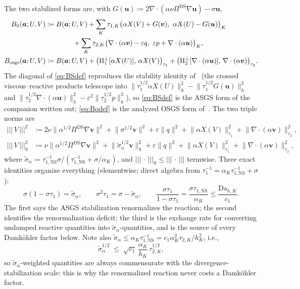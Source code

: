 \documentclass[11pt]{article}
\theoremstyle{remark}
\newcommand{\bu}{\boldsymbol{u}}
\newcommand{\bv}{\boldsymbol{v}}
\newcommand{\ba}{\boldsymbol{a}}
\newcommand{\ViscProj}{\Pi^{\mathrm{DS}}}
\newcommand{\norm}[1]{\lVert #1 \rVert}
\newcommand{\tnorm}[1]{\lvert\!\lvert\!\lvert\, #1 \,\rvert\!\rvert\!\rvert}
\newcommand{\tns}{\tau_{1,\mathrm{NS}}}
\newcommand{\Dah}{\mathrm{Da}_{h,K}}
\newcommand{\Poneo}{\Pi_{1}^{\perp}}
\newcommand{\Ptwoo}{\Pi_{2}^{\perp}}
\newcommand{\st}{\widetilde{\sigma}_\alpha}
\newcommand{\Bs}{B_{\mathrm{S}}}
\newcommand{\Bo}{B_{\mathrm{osgs}}}
\begin{document}
The two stabilized forms are, with $G(\bu) \coloneqq
2\nabla\cdot(\alpha\nu\ViscProj\nabla\bu) - \sigma\bu$,
\begin{align}
  \Bs(\ba; U, V)
  &\coloneqq B(\ba; U, V)
  + \sum_K \tau_{1,K}\bigl( \alpha X(V) + G(\bv),\ \alpha X(U) - G(\bu) \bigr)_K
  \notag\\
  &\qquad\qquad
  + \sum_K \tau_{2,K}\bigl( \nabla\cdot(\alpha\bv) - \varepsilon q,\
  \varepsilon p + \nabla\cdot(\alpha\bu) \bigr)_K,
  \label{eq:BSdef}\\
  \Bo(\ba; U, V)
  &\coloneqq B(\ba; U, V)
  + \bigl( \Poneo[\alpha X(U)],\, \alpha X(V) \bigr)_{\tau_1}
  + \bigl( \Ptwoo[\nabla\cdot(\alpha\bu)],\, \nabla\cdot(\alpha\bv) \bigr)_{\tau_2}.
  \label{eq:Bodef}
\end{align}
The diagonal of \cref{eq:BSdef} reproduces the stability identity
of~\cite{companion} (the crossed viscous--reactive products telescope into
$\norm{\tau_1^{1/2}\alpha X(U)}_h^2 - \norm{\tau_1^{1/2}G(\bu)}_h^2$ and
$\norm{\tau_2^{1/2}\nabla\cdot(\alpha\bu)}_h^2 - \varepsilon^2
\norm{\tau_2^{1/2}p}_h^2$), so \cref{eq:BSdef} is the ASGS form of the companion
written out; \cref{eq:Bodef} is the analyzed OSGS form of~\cite{OSGSnote}. The two
triple norms are
\begin{align}
  \tnorm{V}^2
  &\coloneqq
  2\nu\norm{\alpha^{1/2}\ViscProj\nabla\bv}^2
  + \norm{\sigma^{1/2}\bv}^2
  + \varepsilon\norm{q}^2
  + \norm{\alpha X(V)}_{\tau_1}^2
  + \norm{\nabla\cdot(\alpha\bv)}_{\tau_2}^2,
  \label{eq:StrongNorm}\\
  \tnorm{V}_{\mathrm{S}}^2
  &\coloneqq
  \nu\norm{\alpha^{1/2}\ViscProj\nabla\bv}^2
  + \norm{\st^{1/2}\bv}_h^2
  + \varepsilon\norm{q}^2
  + \norm{\alpha X(V)}_{\tau_1}^2
  + \norm{\nabla\cdot(\alpha\bv)}_{\tau_2}^2,
  \label{eq:ASGSNorm}
\end{align}
where $\st \coloneqq \tns^{-1}\sigma/(\tns^{-1}+\sigma/\alpha_K)$, and
$\tnorm{\cdot}_{\mathrm{S}} \le \tnorm{\cdot}$ termwise. Three exact identities
organize everything (elementwise; direct algebra from
$\tau_1^{-1} = \alpha_K\tns^{-1} + \sigma$):
\begin{equation}
  \label{eq:ThreeIdentities}
  \sigma(1 - \sigma\tau_1) = \st,
  \qquad
  \sigma^2\tau_1 = \sigma - \st,
  \qquad
  \frac{\sigma\tau_1}{1-\sigma\tau_1} = \frac{\sigma\tns}{\alpha_K} \le \frac{\Dah}{c_1}.
\end{equation}
The first says the ASGS stabilization renormalizes the reaction; the second
identifies the renormalization deficit; the third is the exchange rate for
converting undamped reactive quantities into $\st$-quantities, and is the source of
every Damk\"ohler factor below. Note also $\st \le \alpha_K\tns^{-1} =
c_1\alpha_K^2\tau_{2,K}/h_K^2$, i.e.,
\begin{equation}
  \label{eq:SigmaTildeScale}
  \st^{1/2} \;\le\; \sqrt{c_1}\,\frac{\alpha_K}{h_K}\,\tau_{2,K}^{1/2},
\end{equation}
so $\st$-weighted quantities are always commensurate with the
divergence-stabilization scale: this is why the renormalized reaction never costs a
Damk\"ohler factor.
\end{document}
